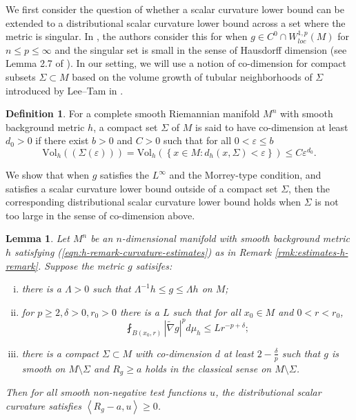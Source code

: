 \documentclass[12pt]{amsart}
\theoremstyle{plain}
\theoremstyle{plain}
\newtheorem{lemma}[subsection]{Lemma}
\theoremstyle{definition}
\newtheorem{definition}[subsection]{Definition}
\theoremstyle{remark}
\numberwithin{equation}{subsection}
\newcommand{\hdel}{\tilde{\nabla}}
\begin{document}
We first consider the question of whether a scalar curvature lower bound can be extended to a distributional scalar curvature lower bound across a set where the metric is singular. In \cite{jiang_removable_2022}, the authors consider this for when $g \in C^0 \cap W^{1,p}_{loc}(M)$ for $n \leq p \leq \infty$ and the singular set is small in the sense of Hausdorff dimension (see Lemma 2.7 of \cite{jiang_removable_2022}). In our setting, we will use a notion of co-dimension for compact subsets $\Sigma \subset M$ based on the volume growth of tubular neighborhoods of $\Sigma$ introduced by Lee--Tam in \cite{lee_continuous_2021}.

\begin{definition}
For a complete smooth Riemannian manifold $M^n$ with smooth background metric $h$, a compact set $\Sigma$ of $M$ is said to have co-dimension at least $d_0 > 0$ if there exist $b > 0$ and $C > 0$ such that for all $0 < \varepsilon \leq b$
\begin{equation*}
    \text{Vol}_h(\left(\Sigma(\varepsilon)\right)) = \text{Vol}_h\left(\left\{x \in M : d_h(x,\Sigma) < \varepsilon\right\}\right) \leq C\varepsilon^{d_0}.
\end{equation*}
\end{definition}

We show that when $g$ satisfies the $L^\infty$ and the Morrey-type condition, and satisfies a scalar curvature lower bound outside of a compact set $\Sigma$, then the corresponding distributional scalar curvature lower bound holds when $\Sigma$ is not too large in the sense of co-dimension above.

\begin{lemma}\label{lem:distributional-scalar-curvature}
    Let $M^n$ be an $n$-dimensional manifold with smooth background metric $h$ satisfying (\ref{eqn:h-remark-curvature-estimates}) as in Remark \ref{rmk:estimates-h-remark}. Suppose the metric $g$ satisifes:
    \begin{enumerate}[(i)]
        \item there is a $\Lambda > 0$ such that $\Lambda^{-1}h \leq g \leq \Lambda h$ on $M$;
        \item for $p \geq 2, \delta > 0, r_0 > 0$ there is a $L$ such that for all $x_0 \in M$ and $0 < r < r_0$,
        \begin{equation}
            \fint_{B(x_0, r)} |\hdel g|^p d\mu_h \leq L r^{-p + \delta};
        \end{equation}
        \item there is a compact $\Sigma \subset M$ with co-dimension $d$ at least $2 - \frac{\delta}{p}$ such that $g$ is smooth on $M \setminus \Sigma$ and $R_g \geq a$ holds in the classical sense on $M \setminus \Sigma$.
    \end{enumerate}
    Then for all smooth non-negative test functions $u$, the distributional scalar curvature satisfies $\left\langle R_g - a, u \right\rangle \geq 0$.
\end{lemma}
\end{document}

